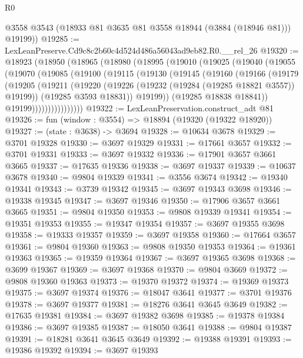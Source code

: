 \begin{lexlean}{R0}
\begin{coremodule}
        @3558
        @3543
        (@18933 @81 @3635 @81 @3558 @18944 (@3884 (@18946 @81)))
        @19199))
@19285 := LexLeanPreserve.Cd9c8c2b60c4d524d486a56043ad9eb82.R0.__rel_26
@19320 := @18923
    (@18950
      (@18965
        (@18980
          (@18995
            (@19010
              (@19025
                (@19040
                  (@19055
                    (@19070
                      (@19085
                        (@19100
                          (@19115
                            (@19130
                              (@19145
                                (@19160
                                  (@19166
                                    (@19179
                                      (@19205
                                        (@19211
                                          (@19220
                                            (@19226 (@19232 (@19284 (@19285 @18821 @3557)) @19199))
                                            (@19285 @3593 @18831))
                                          @19199))
                                      (@19285 @18838 @18841))
                                    @19199))))))))))))))))
@19322 := LexLeanPreservation.construct_adt @81
@19326 := fun (window : @3554) => @18894 (@19320 (@19322 @18920))
@19327 := (state : @3638) -> @3694
@19328 := @10634 @3678
@19329 := @3701 @19328
@19330 := @3697 @19329
@19331 := @17661 @3657
@19332 := @3701 @19331
@19333 := @3697 @19332
@19336 := @17901 @3657 @3661 @3665
@19337 := @17635 @19336
@19338 := @3697 @19337
@19339 := @10637 @3678
@19340 := @9804 @19339
@19341 := @3556 @3674
@19342 := @19340 @19341
@19343 := @3739 @19342
@19345 := @3697 @19343 @3698
@19346 := @19338 @19345
@19347 := @3697 @19346
@19350 := @17906 @3657 @3661 @3665
@19351 := @9804 @19350
@19353 := @9808 @19339 @19341
@19354 := @19351 @19353
@19355 := @19347 @19354
@19357 := @3697 @19355 @3698
@19358 := @19333 @19357
@19359 := @3697 @19358
@19360 := @17664 @3657
@19361 := @9804 @19360
@19363 := @9808 @19350 @19353
@19364 := @19361 @19363
@19365 := @19359 @19364
@19367 := @3697 @19365 @3698
@19368 := @3699 @19367
@19369 := @3697 @19368
@19370 := @9804 @3669
@19372 := @9808 @19360 @19363
@19373 := @19370 @19372
@19374 := @19369 @19373
@19375 := @3697 @19374
@19376 := @18047 @3641
@19377 := @3701 @19376
@19378 := @3697 @19377
@19381 := @18276 @3641 @3645 @3649
@19382 := @17635 @19381
@19384 := @3697 @19382 @3698
@19385 := @19378 @19384
@19386 := @3697 @19385
@19387 := @18050 @3641
@19388 := @9804 @19387
@19391 := @18281 @3641 @3645 @3649
@19392 := @19388 @19391
@19393 := @19386 @19392
@19394 := @3697 @19393

\end{coremodule}
\end{lexlean}
